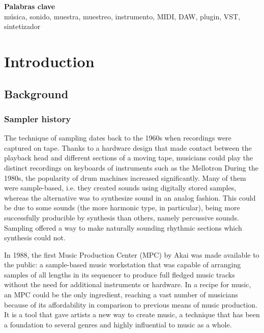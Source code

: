 \documentclass[12pt, a4paper, hidelinks]{article}
\begin{document}
	
	\vspace*{\fill}
	\large
	\textbf{Palabras clave}\\
	
	\vspace{-1em}
	\normalsize	
	\noindent música, sonido, muestra, muestreo, instrumento, MIDI, DAW, plugin, VST, sintetizador
	
	
	
	\newpage
	\tableofcontents %


	\newpage
	\section{Introduction} 
	\subsection{Background}
	\subsubsection{Sampler history}
	The technique of sampling dates back to the 1960s when recordings were captured on tape. Thanks to a hardware design that made contact between the playback head and different sections of a moving tape, musicians could play the distinct recordings on keyboards of instruments such as the Mellotron %
	During the 1980s, the popularity of drum machines increased significantly. Many of them were sample-based, i.e. they created sounds using digitally stored samples, whereas the alternative was to synthesize sound in an analog fashion. This could be due to some sounds (the more harmonic type, in particular), being more successfully producible by synthesis than others, namely percussive sounds. Sampling offered a way to make naturally sounding rhythmic sections which synthesis could not.\par
	In 1988, the first Music Production Center (MPC) by Akai %
	was made available to the public: a sample-based music workstation that was capable of arranging samples of all lengths in its sequencer to produce full fledged music tracks without the need for additional instruments or hardware. In a recipe for music, an MPC could be the only ingredient, reaching a vast number of musicians because of its affordability in comparison to previous means of music production. It is a tool that gave artists a new way to create music, a technique that has been a foundation to several genres and highly influential to music as a whole.\par
	
\end{document}
